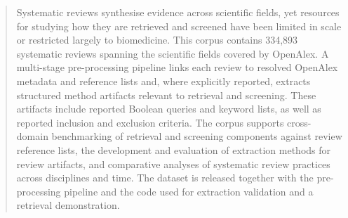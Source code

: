 \begin{abstract}
Systematic reviews synthesise evidence across scientific fields, yet resources for studying how they are retrieved and screened have been limited in scale or restricted largely to biomedicine. This corpus contains 334,893 systematic reviews spanning the scientific fields covered by OpenAlex. A multi-stage pre-processing pipeline links each review to resolved OpenAlex metadata and reference lists and, where explicitly reported, extracts structured method artifacts relevant to retrieval and screening. These artifacts include reported Boolean queries and keyword lists, as well as reported inclusion and exclusion criteria. The corpus supports cross-domain benchmarking of retrieval and screening components against review reference lists, the development and evaluation of extraction methods for review artifacts, and comparative analyses of systematic review practices across disciplines and time. The dataset is released together with the pre-processing pipeline and the code used for extraction validation and a retrieval demonstration.
\end{abstract}